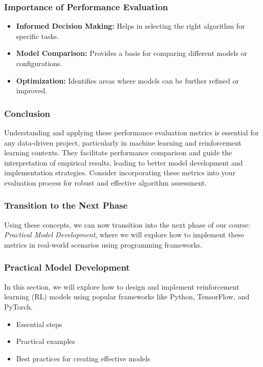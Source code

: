 \documentclass[aspectratio=169]{beamer}
\begin{document}
\begin{frame}[fragile]
    \frametitle{Importance of Performance Evaluation}
    \begin{itemize}
        \item \textbf{Informed Decision Making:} Helps in selecting the right algorithm for specific tasks.
        \item \textbf{Model Comparison:} Provides a basis for comparing different models or configurations.
        \item \textbf{Optimization:} Identifies areas where models can be further refined or improved.
    \end{itemize}
\end{frame}

\begin{frame}[fragile]
    \frametitle{Conclusion}
    Understanding and applying these performance evaluation metrics is essential for any data-driven project, particularly in machine learning and reinforcement learning contexts. 
    They facilitate performance comparison and guide the interpretation of empirical results, leading to better model development and implementation strategies. 
    Consider incorporating these metrics into your evaluation process for robust and effective algorithm assessment.
\end{frame}

\begin{frame}[fragile]
    \frametitle{Transition to the Next Phase}
    Using these concepts, we can now transition into the next phase of our course: \textit{Practical Model Development}, 
    where we will explore how to implement these metrics in real-world scenarios using programming frameworks.
\end{frame}

\begin{frame}[fragile]
    \frametitle{Practical Model Development}
    In this section, we will explore how to design and implement reinforcement learning (RL) models using popular frameworks like Python, TensorFlow, and PyTorch. 
    \begin{itemize}
        \item Essential steps
        \item Practical examples
        \item Best practices for creating effective models
    \end{itemize}
\end{frame}
\end{document}
